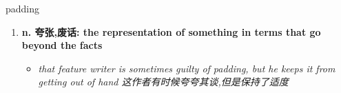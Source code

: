 
\begin{frame}
{\huge padding}
\begin{center}
\begin{enumerate}\Large
  \item \textbf{n. 夸张,废话: the representation of something in terms that go beyond the facts}
  \begin{itemize}
    \item \em{\Large{that feature writer is sometimes guilty of padding, but he keeps it from getting out of hand 这作者有时候夸夸其谈,但是保持了适度}}
  \end{itemize}
\end{enumerate}
\end{center}
\end{frame}
